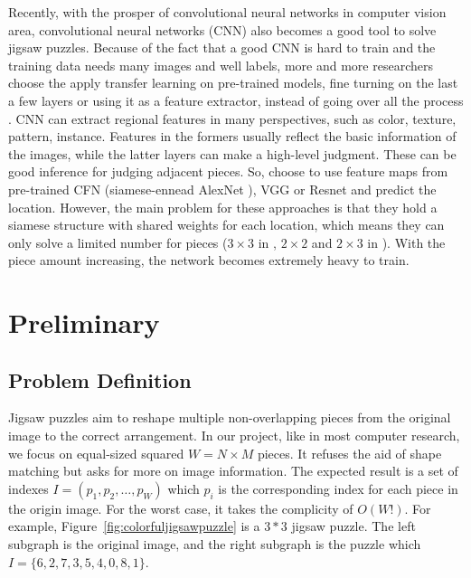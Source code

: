 \documentclass{article}
\begin{document}
Recently, with the prosper of convolutional neural networks in computer vision area, convolutional neural networks (CNN) also becomes a good tool to solve jigsaw puzzles. Because of the fact that a good CNN is hard to train and the training data needs many images and well labels, more and more researchers choose the apply transfer learning on pre-trained models, fine turning on the last a few layers or using it as a feature extractor, instead of going over all the process \cite{razavian2014cnn}. CNN can extract regional features in many perspectives, such as color, texture, pattern, instance. Features in the formers usually reflect the basic information of the images, while the latter layers can make a high-level judgment. These can be good inference for judging adjacent pieces. So, \cite{deryneural,noroozi2016unsupervised} choose to use feature maps from pre-trained CFN \cite{noroozi2016unsupervised} (siamese-ennead AlexNet \cite{krizhevsky2012imagenet}), VGG \cite{he2016deep} or Resnet \cite{simonyan2014very} and predict the location. However, the main problem for these approaches is that they hold a siamese structure with shared weights for each location, which means they can only solve a limited number for pieces ($3\times3$ in \cite{noroozi2016unsupervised}, $2\times2$ and $2\times3$ in \cite{deryneural}). With the piece amount increasing, the network becomes extremely heavy to train.

\section{Preliminary}

\subsection{Problem Definition}

Jigsaw puzzles aim to reshape multiple non-overlapping pieces from the original image to the correct arrangement. In our project, like in most computer research, we focus on equal-sized squared $W=N\times M$ pieces. It refuses the aid of shape matching but asks for more on image information. The expected result is a set of indexes $I=(p_1,p_2,\dots,p_W)$ which $p_i$ is the corresponding index for each piece in the origin image. For the worst case, it takes the complicity of $O(W!)$. For example, Figure~\ref{fig:colorfuljigsawpuzzle} is a $3*3$ jigsaw puzzle. The left subgraph is the original image, and the right subgraph is the puzzle which $I=\{6,2,7,3,5,4,0,8,1\}$.
\end{document}
